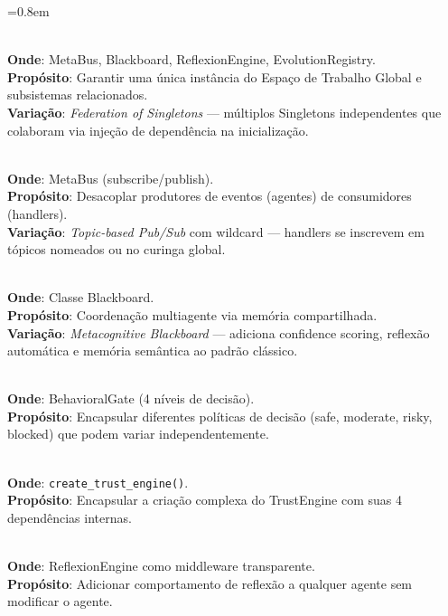 \begin{description}
    \itemsep=0.8em
    
    \item[Singleton] \hfill \\
    \textbf{Onde}: MetaBus, Blackboard, ReflexionEngine, EvolutionRegistry. \\
    \textbf{Propósito}: Garantir uma única instância do Espaço de Trabalho Global e subsistemas relacionados. \\
    \textbf{Variação}: \textit{Federation of Singletons} — múltiplos Singletons independentes que colaboram via injeção de dependência na inicialização.
    
    \item[Observer (Pub/Sub)] \hfill \\
    \textbf{Onde}: MetaBus (subscribe/publish). \\
    \textbf{Propósito}: Desacoplar produtores de eventos (agentes) de consumidores (handlers). \\
    \textbf{Variação}: \textit{Topic-based Pub/Sub} com wildcard — handlers se inscrevem em tópicos nomeados ou no curinga global.
    
    \item[Blackboard] \hfill \\
    \textbf{Onde}: Classe Blackboard. \\
    \textbf{Propósito}: Coordenação multiagente via memória compartilhada. \\
    \textbf{Variação}: \textit{Metacognitive Blackboard} — adiciona confidence scoring, reflexão automática e memória semântica ao padrão clássico.
    
    \item[Strategy] \hfill \\
    \textbf{Onde}: BehavioralGate (4 níveis de decisão). \\
    \textbf{Propósito}: Encapsular diferentes políticas de decisão (safe, moderate, risky, blocked) que podem variar independentemente.
    
    \item[Factory Method] \hfill \\
    \textbf{Onde}: \texttt{create\_trust\_engine()}. \\
    \textbf{Propósito}: Encapsular a criação complexa do TrustEngine com suas 4 dependências internas.
    
    \item[Decorator] \hfill \\
    \textbf{Onde}: ReflexionEngine como middleware transparente. \\
    \textbf{Propósito}: Adicionar comportamento de reflexão a qualquer agente sem modificar o agente.
    

\end{description}
